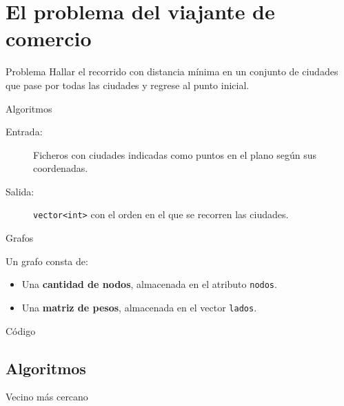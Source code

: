 \section{El problema del viajante de comercio}

\begin{frame}{Problema}
Hallar el recorrido con distancia mínima en un conjunto de
ciudades que pase por todas las ciudades y regrese al punto inicial.
\end{frame}

\begin{frame}{Algoritmos}
\begin{description}
 \item[Entrada:] Ficheros con ciudades indicadas como puntos en el plano según sus
 coordenadas.
 \item[Salida:] \texttt{vector<int>} con el orden en el que se recorren las ciudades.
\end{description}
\end{frame}

\begin{frame}{Grafos}

Un grafo consta de:

\begin{itemize}
  \item Una \textbf{cantidad de nodos}, almacenada en el atributo \texttt{nodos}.
  \item Una \textbf{matriz de pesos}, almacenada en el vector \texttt{lados}.
\end{itemize}
\end{frame}

\begin{frame}[fragile]{Código}

\end{frame}

\subsection{Algoritmos}

\begin{frame}[fragile]{Vecino más cercano}

\end{frame}

